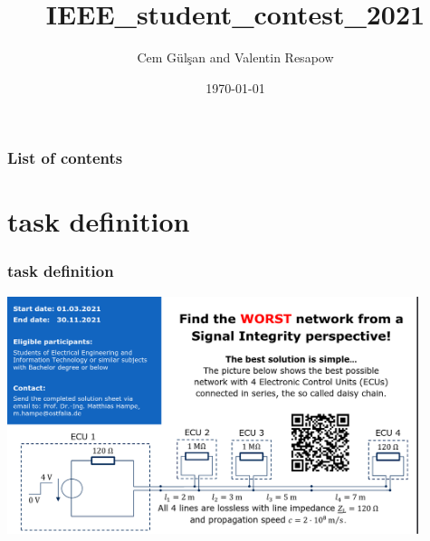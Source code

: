 \documentclass{beamer}
\title[Short title]{IEEE\_student\_contest\_2021} %
\author{Cem Gülşan and Valentin Resapow} %
\institute[Institute of Electromagnetic Theory] %
{
Institute of Electromagnetic Theory\\ %
\medskip
\textit{cem.guelsan@tuhh.de}\\ %
\textit{valentin.resapow@tuhh.de}
}
\date{\today} %
\begin{document}
\begin{frame}
\titlepage %
\end{frame}

\begin{frame}
\frametitle{List of contents}

\tableofcontents[hideallsubsections]

\end{frame}








\section{task definition} 


\begin{frame}
\frametitle{task definition}

\includegraphics[width=12cm, height=7cm]{task_defintion.png}
\end{frame}
\end{document}
